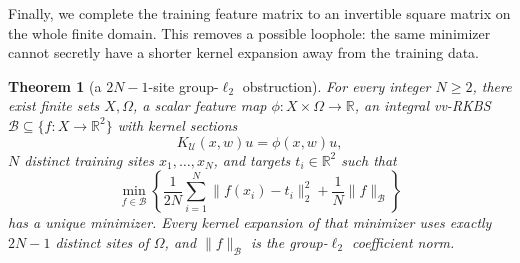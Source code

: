 \documentclass[11pt]{article}
\newtheorem{theorem}{Theorem}
\newcommand{\R}{\mathbb R}
\newcommand{\B}{\mathcal B}
\newcommand{\U}{\mathcal U}
\begin{document}
Finally, we complete the training feature matrix to an invertible square
matrix on the whole finite domain.  This removes a possible loophole: the
same minimizer cannot secretly have a shorter kernel expansion away from the
training data.

\begin{theorem}[a \(2N-1\)-site group-\(\ell_2\) obstruction]\label{thm:main}
For every integer \(N\ge2\), there exist finite sets \(X,\Omega\), a scalar
feature map \(\phi:X\times\Omega\to\R\), an integral vv-RKBS
\(\B\subseteq\{f:X\to\R^2\}\) with kernel sections
\[
 K_{\U}(x,w)u=\phi(x,w)u,
\]
\(N\) distinct training sites \(x_1,\ldots,x_N\), and targets
\(t_i\in\R^2\) such that
\begin{equation}\label{eq:objective}
 \min_{f\in\B}\left\{
 \frac1{2N}\sum_{i=1}^N\|f(x_i)-t_i\|_2^2
 +\frac1N\|f\|_{\B}\right\}
\end{equation}
has a unique minimizer.  Every kernel expansion of that minimizer uses
exactly \(2N-1\) distinct sites of \(\Omega\), and
\(\|f\|_{\B}\) is the group-\(\ell_2\) coefficient norm.
\end{theorem}
\end{document}
